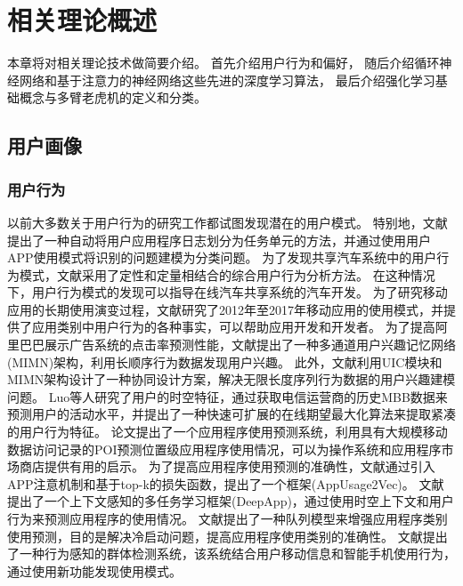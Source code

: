 \section{相关理论概述}
本章将对相关理论技术做简要介绍。
首先介绍用户行为和偏好，
随后介绍循环神经网络和基于注意力的神经网络这些先进的深度学习算法，
最后介绍强化学习基础概念与多臂老虎机的定义和分类。

\subsection{用户画像}
\subsubsection{用户行为}
以前大多数关于用户行为的研究工作都试图发现潜在的用户模式。%
特别地，文献\cite{tian2020identifying}提出了一种自动将用户应用程序日志划分为任务单元的方法，并通过使用用户APP使用模式将识别的问题建模为分类问题。%
为了发现共享汽车系统中的用户行为模式，文献\cite{verbraken2012novel}采用了定性和定量相结合的综合用户行为分析方法。%
在这种情况下，用户行为模式的发现可以指导在线汽车共享系统的汽车开发。
为了研究移动应用的长期使用演变过程，文献\cite{li2020apps}研究了2012年至2017年移动应用的使用模式，并提供了应用类别中用户行为的各种事实，可以帮助应用开发和开发者。%
为了提高阿里巴巴展示广告系统的点击率预测性能，文献\cite{pi2019practice}提出了一种多通道用户兴趣记忆网络(MIMN)架构，利用长顺序行为数据发现用户兴趣。%
此外，文献利用UIC模块和MIMN架构设计了一种协同设计方案，解决无限长度序列行为数据的用户兴趣建模问题。
Luo等人研究了用户的时空特征，通过获取电信运营商的历史MBB数据来预测用户的活动水平，并提出了一种快速可扩展的在线期望最大化算法来提取紧凑的用户行为特征。
论文\cite{yu2018smartphone}提出了一个应用程序使用预测系统，利用具有大规模移动数据访问记录的POI预测位置级应用程序使用情况，可以为操作系统和应用程序市场商店提供有用的启示。
为了提高应用程序使用预测的准确性，文献\cite{zhang2020general}通过引入APP注意机制和基于top-k的损失函数，提出了一个框架(AppUsage2Vec)。
文献\cite{xia2020deepapp}提出了一个上下文感知的多任务学习框架(DeepApp)，通过使用时空上下文和用户行为来预测应用程序的使用情况。
文献\cite{tian2020cohort}提出了一种队列模型来增强应用程序类别使用预测，目的是解决冷启动问题，提高应用程序使用类别的准确性。
文献\cite{shen2019bag}提出了一种行为感知的群体检测系统，该系统结合用户移动信息和智能手机使用行为，通过使用新功能发现使用模式。

